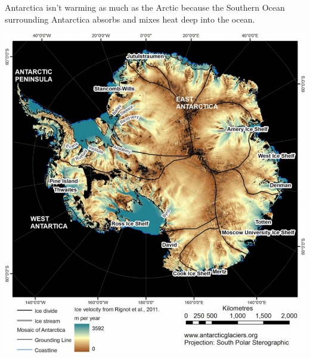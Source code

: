 Antarctica isn't warming as much as the Arctic because the Southern Ocean surrounding Antarctica absorbs and mixes heat deep into the ocean\cite{L_T_C_C}.












\begin{Figure}
\centering
\includegraphics[width=1.1\linewidth]{antarctica_velocity.pdf}
\label{fig:Antarctica_velocity}
\end{Figure}

